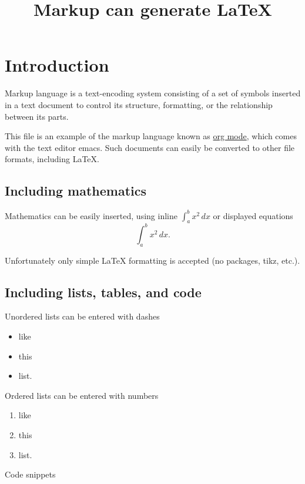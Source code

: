 \documentclass[11pt]{article}
\date{}
\title{Markup can generate \LaTeX{}}
\begin{document}
\maketitle

\section*{Introduction}
\label{sec:org7aa50bb}

Markup language is a text-encoding system consisting of a set of symbols inserted in a
text document to control its structure, formatting, or the relationship between its parts.

This file is an example of the markup language known as \href{https://en.wikipedia.org/wiki/Org-mode}{org mode}, which comes with the
text editor emacs.  Such documents can easily be converted to other file formats,
including \LaTeX{}.

\subsection*{Including mathematics}
\label{sec:orgafb435c}

Mathematics can be easily inserted, using inline \(\int_a^b x^2 \, dx\) or displayed
equations
\[\int_a^b x^2 \, dx.\]

Unfortunately only simple \LaTeX{} formatting is accepted (no packages, tikz, etc.).

\subsection*{Including lists, tables, and code}
\label{sec:org22de1a5}

Unordered lists can be entered with dashes

\begin{itemize}
\item like
\item this
\item list.
\end{itemize}

Ordered lists can be entered with numbers

\begin{enumerate}
\item like
\item this
\item list.
\end{enumerate}

Code snippets
\end{document}
